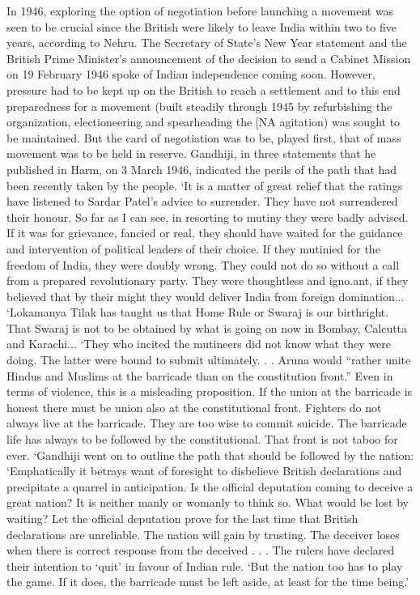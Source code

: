 In 1946, exploring the option of negotiation before launching a movement was seen to be crucial since the British were likely to leave India within two to five years, according to Nehru. The Secretary of State’s New Year statement and the British Prime Minister’s announcement of the decision to send a Cabinet Mission on 19 February 1946 spoke of Indian independence coming soon. However, pressure had to be kept up on the British to reach a settlement and to this end preparedness for a movement (built steadily through 1945 by refurbishing the organization, electioneering and spearheading the [NA agitation) was sought to be maintained. But the card of negotiation was to be, played first, that of mass movement was to be held in reserve. Gandhiji, in three statements that he published in Harm, on 3 March 1946, indicated the perils of the path that had been recently taken by the people. ‘It is a matter of great relief that the ratings have listened to Sardar Patel’s advice to surrender. They have not surrendered their honour. So far as I can see, in resorting to mutiny they were badly advised. If it was for grievance, fancied or real, they should have waited for the guidance and intervention of political leaders of their choice. If they mutinied for the freedom of India, they were doubly wrong. They could not do so without a call from a prepared revolutionary party. They were thoughtless and igno.ant, if they believed that by their might they would deliver India from foreign domination... ‘Lokamanya Tilak has taught us that Home Rule or Swaraj is our birthright. That Swaraj is not to be obtained by what is going on now in Bombay, Calcutta and Karachi... ‘They who incited the mutineers did not know what they were doing. The latter were bound to submit ultimately. . . Aruna would “rather unite Hindus and Muslims at the barricade than on the constitution front.” Even in terms of violence, this is a misleading proposition. If the union at the barricade is honest there must be union also at the constitutional front. Fighters do not always live at the barricade. They are too wise to commit suicide. The barricade life has always to be followed by the constitutional. That front is not taboo for ever. ‘Gandhiji went on to outline the path that should be followed by the nation: ‘Emphatically it betrays want of foresight to disbelieve British declarations and precipitate a quarrel in anticipation. Is the official deputation coming to deceive a great nation? It is neither manly or womanly to think so. What would be lost by waiting? Let the official deputation prove for the last time that British declarations are unreliable. The nation will gain by trusting. The deceiver loses when there is correct response from the deceived . . . The rulers have declared their intention to ‘quit’ in favour of Indian rule. ‘But the nation too has to play the game. If it does, the barricade must be left aside, at least for the time being.’
